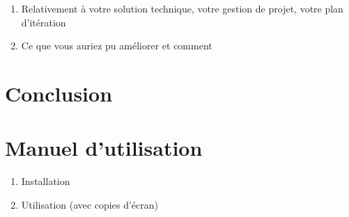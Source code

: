 \documentclass[a4paper,11pt]{article}
\begin{document}
	
	\begin{enumerate}
		\item Relativement à votre solution technique, votre gestion de projet, votre plan d'itération
		\item Ce que vous auriez pu améliorer et comment
	\end{enumerate}


	\section{Conclusion}
	
	
	\appendix
	\section{Manuel d'utilisation} \label{app:manuelUtil}
	\begin{enumerate}
		\item Installation
		\item Utilisation (avec copies d'écran)
	\end{enumerate}
\end{document}
